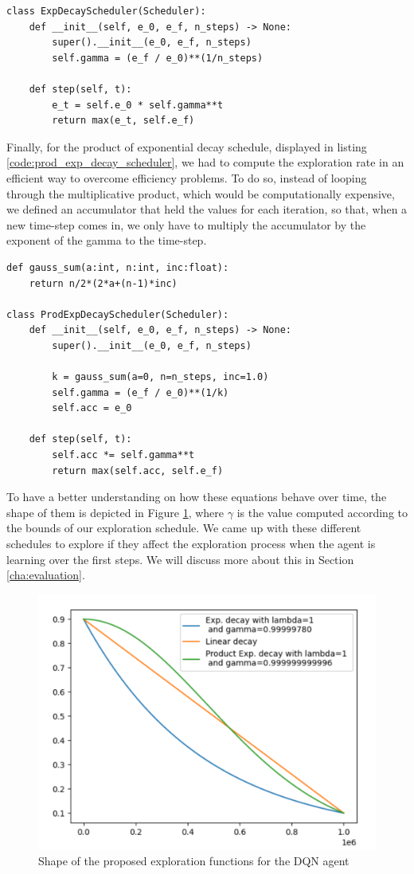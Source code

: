 \begin{lstlisting}[caption={Exponential scheduler class}, label={code:exp_decay_scheduler}]
class ExpDecayScheduler(Scheduler):
	def __init__(self, e_0, e_f, n_steps) -> None:
		super().__init__(e_0, e_f, n_steps)
		self.gamma = (e_f / e_0)**(1/n_steps)
	
	def step(self, t):
		e_t = self.e_0 * self.gamma**t
		return max(e_t, self.e_f)
\end{lstlisting}

Finally, for the product of exponential decay schedule, displayed in listing \ref{code:prod_exp_decay_scheduler}, we had to compute the exploration rate in an efficient way to overcome efficiency problems. To do so, instead of looping through the multiplicative product, which would be computationally expensive, we defined an accumulator that held the values for each iteration, so that, when a new time-step comes in, we only have to multiply the accumulator by the exponent of the gamma to the time-step.

\begin{lstlisting}[caption={Product of exponentials decay schedule}, label={code:prod_exp_decay_scheduler}]
def gauss_sum(a:int, n:int, inc:float):
	return n/2*(2*a+(n-1)*inc)
	
class ProdExpDecayScheduler(Scheduler):
	def __init__(self, e_0, e_f, n_steps) -> None:
		super().__init__(e_0, e_f, n_steps)
	
		k = gauss_sum(a=0, n=n_steps, inc=1.0)
		self.gamma = (e_f / e_0)**(1/k)
		self.acc = e_0
	
	def step(self, t):
		self.acc *= self.gamma**t
		return max(self.acc, self.e_f)
\end{lstlisting}

To have a better understanding on how these equations behave over time, the shape of them is depicted in Figure \ref{fig:shape_exp_funs}, where $\gamma$ is the value computed according to the bounds of our exploration schedule. We came up with these different schedules to explore if they affect the exploration process when the agent is learning over the first steps. We will discuss more about this in Section \ref{cha:evaluation}.

\begin{figure}[!h]
	\centering
	\includegraphics[width=0.7\linewidth]{figures/shape_exploration_functions}
	\caption{Shape of the proposed exploration functions for the DQN agent}
	\label{fig:shape_exp_funs}
\end{figure}


